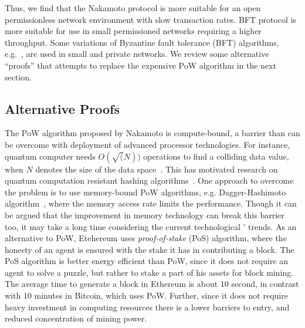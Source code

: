 Thus, we find that the Nakamoto protocol is more suitable for an open permissionless network environment with slow transaction rates. 
BFT protocol is more suitable for use in small permissioned networks requiring a higher throughput. Some variations of Byzantine fault 
tolerance (BFT) algorithms, e.g.~\citep{Castro:2002}, are used in small and private networks. We review some alternative ``proofs'' 
that attempts to replace the expensive PoW algorithm in the next section.

\subsection{Alternative Proofs}

The PoW algorithm proposed by Nakamoto is compute-bound, a barrier than can be overcome with deployment of advanced processor
technologies. For instance, quantum computer needs $O(\sqrt(N))$ operations to find a colliding data value, when $N$ denotes 
the size of the data space~\citep{Brassard:1997}. This has motivated research on quantum computation resistant hashing 
algorithms~\citep{Fernandez-Carames:2020}. One approach to overcome the problem is to use memory-bound PoW algorithms, e.g. 
Dagger-Hashimoto algorithm~\citep{Buterin:2013}, where the memory access rate limits the performance. Though it can be argued 
that the improvement in memory technology can break this barrier too, it may take a long time considering the current technological '
trends. 
%
As an alternative to PoW, Etehereum uses {\em proof-of-stake} (PoS) algorithm,
where the honesty of an agent is ensured with the stake it has in contributing a block. The PoS algorithm is better energy efficient
than PoW, since it does not require an agent to solve a puzzle, but rather to stake a part of his assets for block mining. The average 
time to generate a block in Ethereum is about 10 second, in contrast with 10 minutes in Bitcoin, which uses PoW. Further, since it does 
not require heavy investment in computing resources there is a lower barriers to entry, and reduced concentration of mining power. 
 
